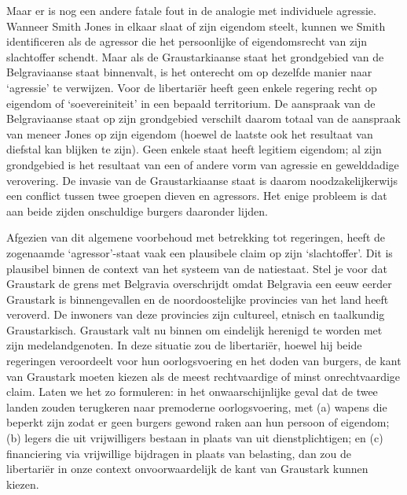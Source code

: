 \documentclass[
  a5paper,
  smalldemyvopaper,10pt,twoside,onecolumn,openright,extrafontsizes,hidelinks]{memoir}
\begin{document}
Maar er is nog een andere fatale fout in de analogie met individuele
agressie. Wanneer Smith Jones in elkaar slaat of zijn eigendom steelt,
kunnen we Smith identificeren als de agressor die het persoonlijke of
eigendomsrecht van zijn slachtoffer schendt. Maar als de Graustarkiaanse
staat het grondgebied van de Belgraviaanse staat binnenvalt, is het
onterecht om op dezelfde manier naar `agressie' te verwijzen. Voor de
libertariër heeft geen enkele regering recht op eigendom of
`soevereiniteit' in een bepaald territorium. De aanspraak van de
Belgraviaanse staat op zijn grondgebied verschilt daarom totaal van de
aanspraak van meneer Jones op zijn eigendom (hoewel de laatste ook het
resultaat van diefstal kan blijken te zijn). Geen enkele staat heeft
legitiem eigendom; al zijn grondgebied is het resultaat van een of
andere vorm van agressie en gewelddadige verovering. De invasie van de
Graustarkiaanse staat is daarom noodzakelijkerwijs een conflict tussen
twee groepen dieven en agressors. Het enige probleem is dat aan beide
zijden onschuldige burgers daaronder lijden.

Afgezien van dit algemene voorbehoud met betrekking tot regeringen,
heeft de zogenaamde `agressor'-staat vaak een plausibele claim op zijn
`slachtoffer'. Dit is plausibel binnen de context van het systeem van de
natiestaat. Stel je voor dat Graustark de grens met Belgravia
overschrijdt omdat Belgravia een eeuw eerder Graustark is binnengevallen
en de noordoostelijke provincies van het land heeft veroverd. De
inwoners van deze provincies zijn cultureel, etnisch en taalkundig
Graustarkisch. Graustark valt nu binnen om eindelijk herenigd te worden
met zijn medelandgenoten. In deze situatie zou de libertariër, hoewel
hij beide regeringen veroordeelt voor hun oorlogsvoering en het doden
van burgers, de kant van Graustark moeten kiezen als de meest
rechtvaardige of minst onrechtvaardige claim. Laten we het zo
formuleren: in het onwaarschijnlijke geval dat de twee landen zouden
terugkeren naar premoderne oorlogsvoering, met (a) wapens die beperkt
zijn zodat er geen burgers gewond raken aan hun persoon of eigendom; (b)
legers die uit vrijwilligers bestaan in plaats van uit dienstplichtigen;
en (c) financiering via vrijwillige bijdragen in plaats van belasting,
dan zou de libertariër in onze context onvoorwaardelijk de kant van
Graustark kunnen kiezen.
\end{document}
